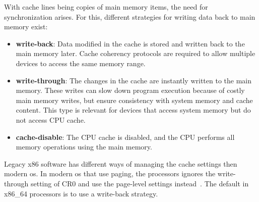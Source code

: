 
With cache lines being copies of main memory items, the need for synchronization
arises. For this, different strategies for writing data back to main memory
exist:
\begin{itemize}
  \item \textbf{write-back}: Data modified in the cache is stored and written
    back to the main memory later. Cache coherency protocols are required to
    allow multiple devices to access the same memory range.
  \item \textbf{write-through}: The changes in the cache are instantly written
    to the main memory. These writes can slow down program execution because of
    costly main memory writes, but ensure consistency with system memory and
    cache content. This type is relevant for devices that access system memory
    but do not access CPU cache.
  \item \textbf{cache-disable}: The CPU cache is disabled, and the CPU
    performs all memory operations using the main memory.
\end{itemize}

Legacy x86 software has different ways of managing the cache settings then
modern \gls{os}. In modern \gls{os} that use paging, the processors ignores the
write-through setting of CR0 and use the page-level settings
instead~\cite{amd_manual}. The default in x86\_64 processors is to use a
write-back strategy.

